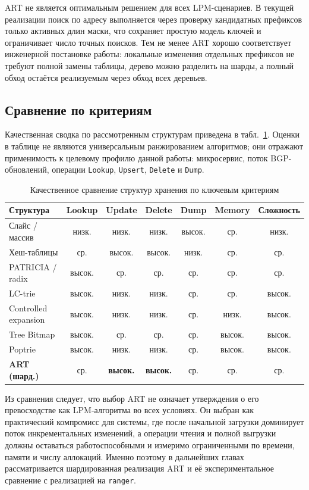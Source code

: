 ART не является оптимальным решением для всех LPM-сценариев. В текущей
реализации поиск по адресу выполняется через проверку кандидатных
префиксов только активных длин маски, что сохраняет простую модель
ключей и ограничивает число точных поисков. Тем не менее ART хорошо
соответствует инженерной постановке работы: локальные изменения
отдельных префиксов не требуют полной замены таблицы, дерево можно
разделить на шарды, а полный обход остаётся реализуемым через обход всех
деревьев.

\subsection{Сравнение по критериям}

Качественная сводка по рассмотренным структурам приведена в
табл.~\ref{tab:lpm-matrix}. Оценки в таблице не являются
универсальным ранжированием алгоритмов; они отражают применимость к
целевому профилю данной работы: микросервис, поток BGP-обновлений,
операции \texttt{Lookup}, \texttt{Upsert}, \texttt{Delete} и
\texttt{Dump}.

\clearpage
\begin{table}[ht]
\centering
\caption{Качественное сравнение структур хранения по ключевым критериям}
\label{tab:lpm-matrix}
\small
\begin{tabular}{lcccccc}
\toprule
Структура & Lookup & Update & Delete & Dump & Memory & Сложность \\
\midrule
Слайс / массив          & низк. & низк. & низк. & высок. & ср. & низк. \\
Хеш-таблицы             & ср.   & высок. & высок. & низк. & ср. & ср. \\
PATRICIA / radix        & высок. & ср. & ср. & ср. & ср. & ср. \\
LC-trie                 & высок. & низк. & низк. & ср. & ср. & высок. \\
Controlled expansion    & высок. & низк. & низк. & ср. & низк. & высок. \\
Tree Bitmap             & высок. & ср. & ср. & ср. & высок. & высок. \\
Poptrie                 & высок. & низк. & низк. & ср. & высок. & высок. \\
\textbf{ART (шард.)}    & ср. & \textbf{высок.} & \textbf{высок.} & ср. & ср. & ср. \\
\bottomrule
\end{tabular}
\end{table}

Из сравнения следует, что выбор ART не означает утверждения о его
превосходстве как LPM-алгоритма во всех условиях. Он выбран как
практический компромисс для системы, где после начальной загрузки
доминирует поток инкрементальных изменений, а операции чтения и полной
выгрузки должны оставаться работоспособными и измеримо ограниченными по
времени, памяти и числу аллокаций. Именно поэтому в дальнейших главах
рассматривается шардированная реализация ART и её экспериментальное
сравнение с реализацией на \texttt{ranger}.

